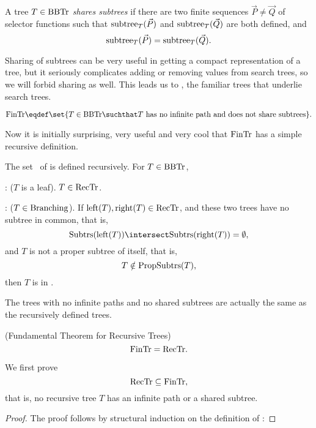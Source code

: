 \begin{definition}
\begin{definition}
A tree $T \in \text{BBTr}$ \emph{shares subtrees} if there are two finite
sequences $\vec{P} \neq \vec{Q}$ of selector functions such that
$\text{subtree}_{T}(\vec{P})$ and $\text{subtree}_{T}(\vec{Q})$ are both defined, and
\[
\text{subtree}_{T}(\vec{P})=\text{subtree}_{T}(\vec{Q}).
\]
\end{definition}
Sharing of subtrees can be very useful in getting a compact
representation of a tree, but it seriously complicates adding or
removing values from search trees, so we will forbid sharing as well.
This leads us to \fintr, the familiar trees that underlie search
trees.
\begin{definition}
\[
\fintr \eqdef \set{T \in \brnch \suchthat T\ \text{has no infinite path and
  does not share subtrees}}.
\]
\end{definition}

Now it is initially surprising, very useful and very cool that
$\text{FinTr}$ has a simple recursive definition.

\begin{definition}
The set \rectr\ of  is defined recursively.  For
$T \in \text{BBTr}$,

: ($T$ is a leaf).  $T \in \text{RecTr}$.

: ($T \in \text{Branching}$).
If $\text{left}(T), \text{right}(T) \in \text{RecTr}$, and these two trees
have no subtree in common, that is,
\[
\subbrn{\leftsub{(T)}} \intersect \subbrn{\rightsub{(T)}} = \emptyset,
\]
and $T$ is not a proper subtree of itself, that is,
\[
T \notin \text{PropSubtrs}(T),
\]
then $T$ is in \rectr.
\end{definition}

The trees with no infinite paths and no shared subtrees are actually
the same as the recursively defined trees.

\begin{theorem}\label{fundthmrec}(Fundamental Theorem for Recursive Trees)
\[
\text{FinTr} = \text{RecTr}.
\]
\end{theorem}

We first prove
\begin{equation}\label{rectrsubfintr}
\text{RecTr} \subseteq \text{FinTr},
\end{equation}
that is, no recursive tree $T$ has an infinite path or a shared subtree.

\begin{proof}
The proof follows by structural induction on the
definition of \rectr:


\end{proof}
\end{definition}
